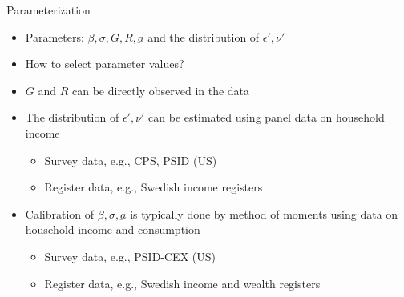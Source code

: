 \documentclass[9pt]{beamer}
\newcommand{\bit}{\begin{itemize}}
\newcommand{\eit}{\end{itemize}}
\begin{document}
\begin{frame}{Parameterization}

\bit
\setlength\itemsep{1em}

\item Parameters: $\beta, \sigma, G, R, \underbar a$ and the distribution of $\epsilon', \nu'$

\item How to select parameter values?

\item $G$ and $R$ can be directly observed in the data

\item The distribution of $\epsilon', \nu'$ can be estimated using panel data on household income
\bit
\setlength\itemsep{0.5em}
\item Survey data, e.g., CPS, PSID (US)
\item Register data, e.g., Swedish income registers
\eit

\item Calibration of $\beta, \sigma, \underbar a$ is typically done by method of moments using data on household income and consumption
\bit
\setlength\itemsep{0.5em}
	\item Survey data, e.g., PSID-CEX (US)
	\item Register data, e.g., Swedish income and wealth registers
\eit


\eit

\end{frame}
\end{document}
